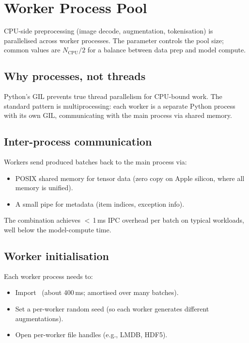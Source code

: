 \section{Worker Process Pool}
\label{sec:data_pipeline:worker_pool}

CPU-side preprocessing (image decode, augmentation, tokenisation)
is parallelised across worker processes. The 
parameter controls the pool size; common values are
$N_{\text{CPU}} / 2$ for a balance between data prep and model
compute.

\subsection{Why processes, not threads}
\label{ssec:data_pipeline:processes_vs_threads}

Python's GIL prevents true thread parallelism for CPU-bound
work. The standard pattern is multiprocessing: each worker is
a separate Python process with its own GIL, communicating with
the main process via shared memory.

\subsection{Inter-process communication}
\label{ssec:data_pipeline:ipc}

Workers send produced batches back to the main process via:
\begin{itemize}
  \item POSIX shared memory for tensor data (zero copy on
    Apple silicon, where all memory is unified).
  \item A small pipe for metadata (item indices, exception
    info).
\end{itemize}

The combination achieves $<$\,1\,ms IPC overhead per batch on
typical workloads, well below the model-compute time.

\subsection{Worker initialisation}
\label{ssec:data_pipeline:worker_init}

Each worker process needs to:
\begin{itemize}
  \item Import \Lucid\ (about 400\,ms; amortised over many
    batches).
  \item Set a per-worker random seed (so each worker generates
    different augmentations).
  \item Open per-worker file handles (e.g., LMDB, HDF5).
\end{itemize}

